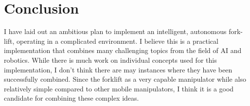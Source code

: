 \documentclass[letterpaper, 10 pt, conference]{ieeeconf}  %
\begin{document}
\section{Conclusion}

I have laid out an ambitious plan to implement an intelligent, autonomous fork-lift, operating in a complicated environment. I believe this is a practical implementation that combines many challenging topics from the field of AI and robotics. While there is much work on individual concepts used for this implementation, I don't think there are may instances where they have been successfully combined. Since the forklift as a very capable manipulator while also relatively simple compared to other mobile manipulators, I think it is a good candidate for combining these complex ideas.






\end{document}
